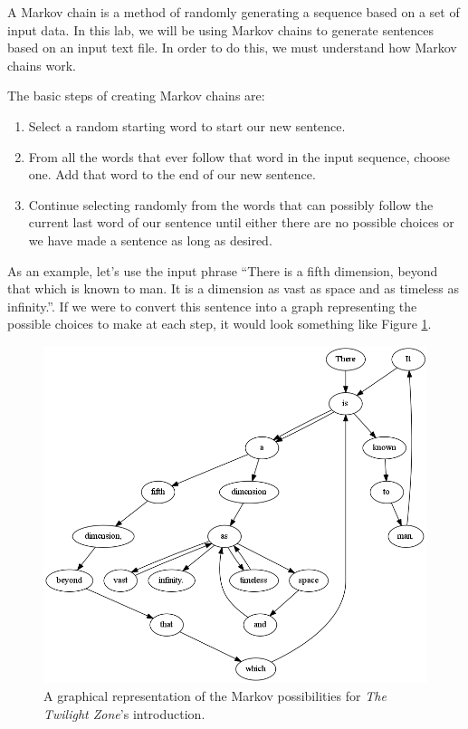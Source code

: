 \documentclass[11pt]{cselabheader}
\begin{document}
A Markov chain is a method of randomly generating a sequence based on a set of input data. In this lab, we will be using Markov chains to generate sentences based on an input text file. In order to do this, we must understand how Markov chains work.

The basic steps of creating Markov chains are:
\begin{enumerate}
\item Select a random starting word to start our new sentence.
\item From all the words that ever follow that word in the input sequence, choose one. Add that word to the end of our new sentence.
\item Continue selecting randomly from the words that can possibly follow the current last word of our sentence until either there are no possible choices or we have made a sentence as long as desired.
\end{enumerate}

As an example, let's use the input phrase ``There is a fifth dimension, beyond that which is known to man. It is a dimension as vast as space and as timeless as infinity.''. If we were to convert this sentence into a graph representing the possible choices to make at each step, it would look something like Figure \ref{twilight}.

\begin{figure}[h]
  \centering
  \includegraphics[width=\linewidth]{lab10/twilight_zone}
  \caption{A graphical representation of the Markov possibilities for \emph{The Twilight Zone}'s introduction.}
  \label{twilight}
\end{figure}
\end{document}
